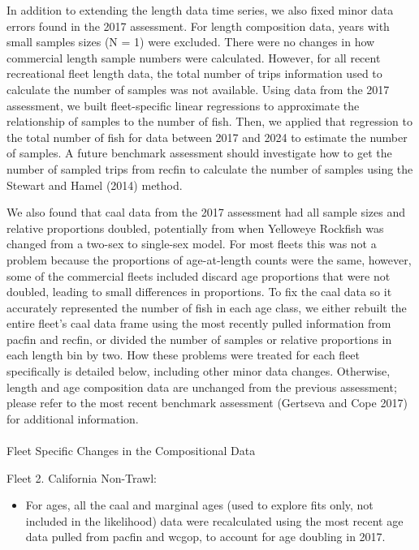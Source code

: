 \documentclass[
  english,
]{article}
\makeatletter
\let\oldparagraph\paragraph
\renewcommand{\paragraph}{
    \@ifstar
      \xxxParagraphStar
      \xxxParagraphNoStar
  }
\newcommand{\xxxParagraphStar}[1]{\oldparagraph*{#1}\mbox{}}
\newcommand{\xxxParagraphNoStar}[1]{\oldparagraph{#1}\mbox{}}
\providecommand{\tightlist}{%
  \setlength{\itemsep}{0pt}\setlength{\parskip}{0pt}}
\makeatother
\begin{document}
In addition to extending the length data time series, we also fixed
minor data errors found in the 2017 assessment. For length composition
data, years with small samples sizes (N = 1) were excluded. There were
no changes in how commercial length sample numbers were calculated.
However, for all recent recreational fleet length data, the total number
of trips information used to calculate the number of samples was not
available. Using data from the 2017 assessment, we built fleet-specific
linear regressions to approximate the relationship of samples to the
number of fish. Then, we applied that regression to the total number of
fish for data between 2017 and 2024 to estimate the number of samples. A
future benchmark assessment should investigate how to get the number of
sampled trips from \gls{recfin} to calculate the number of samples using
the Stewart and Hamel (2014) method.

We also found that \gls{caal} data from the 2017 assessment had all
sample sizes and relative proportions doubled, potentially from when
Yelloweye Rockfish was changed from a two-sex to single-sex model. For
most fleets this was not a problem because the proportions of
age-at-length counts were the same, however, some of the commercial
fleets included discard age proportions that were not doubled, leading
to small differences in proportions. To fix the \gls{caal} data so it
accurately represented the number of fish in each age class, we either
rebuilt the entire fleet's \gls{caal} data frame using the most recently
pulled information from \gls{pacfin} and \gls{recfin}, or divided the
number of samples or relative proportions in each length bin by two. How
these problems were treated for each fleet specifically is detailed
below, including other minor data changes. Otherwise, length and age
composition data are unchanged from the previous assessment; please
refer to the most recent benchmark assessment (Gertseva and Cope 2017)
for additional information.

\paragraph{Fleet Specific Changes in the Compositional
Data}\label{fleet-specific-changes-in-the-compositional-data}

Fleet 2. California Non-Trawl:

\begin{itemize}
\tightlist
\item
  For ages, all the \gls{caal} and marginal ages (used to explore fits
  only, not included in the likelihood) data were recalculated using the
  most recent age data pulled from \gls{pacfin} and \gls{wcgop}, to
  account for age doubling in 2017.
\end{itemize}
\end{document}
